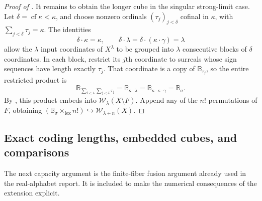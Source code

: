 \documentclass[11pt]{article}
\theoremstyle{definition}
\theoremstyle{remark}
\newcommand{\WO}{\mathcal W}
\newcommand{\B}{\mathbb B}
\newcommand{\lex}{\mathrm{lex}}
\newcommand{\cf}{\operatorname{cf}}
\newcommand{\emb}{\hookrightarrow}
\begin{document}
\begin{proof}[Proof of ]
It remains to obtain the longer cube in the singular strong-limit
case.  Let $\delta=\cf\kappa<\kappa$, and choose nonzero ordinals
$(\tau_j)_{j<\delta}$ cofinal in $\kappa$, with
$\sum_{j<\delta}\tau_j=\kappa$.  The identities
\[
 \delta\cdot\kappa=\kappa,
 \qquad
 \delta\cdot\lambda=\delta\cdot(\kappa\cdot\gamma)=\lambda
\]
allow the $\lambda$ input coordinates of $X^\lambda$ to be grouped
into $\lambda$ consecutive blocks of $\delta$ coordinates.  In each
block, restrict its $j$th coordinate to surreals whose sign sequences
have length exactly $\tau_j$.  That coordinate is a copy of
$\B_{\tau_j}$, so the entire restricted product is
\[
 \B_{\sum_{i<\lambda}\sum_{j<\delta}\tau_j}
       =\B_{\kappa\cdot\lambda}
       =\B_{\kappa\cdot\kappa\cdot\gamma}
       =\B_\sigma.
\]
By , this product embeds into
$\WO_\lambda(X\setminus F)$.  Append any of the $n!$ permutations
of $F$, obtaining $(\B_{\sigma}\times_{\lex}n!)\emb\WO_{\lambda+n}(X)$.
\end{proof}

\subsection{Exact coding lengths, embedded cubes, and comparisons}
\label{swo:vi:sub:cb-coding}

The next capacity argument is the finite-fiber fusion argument already
used in the real-alphabet report.  It is included to make the numerical
consequences of the extension explicit.
\end{document}
